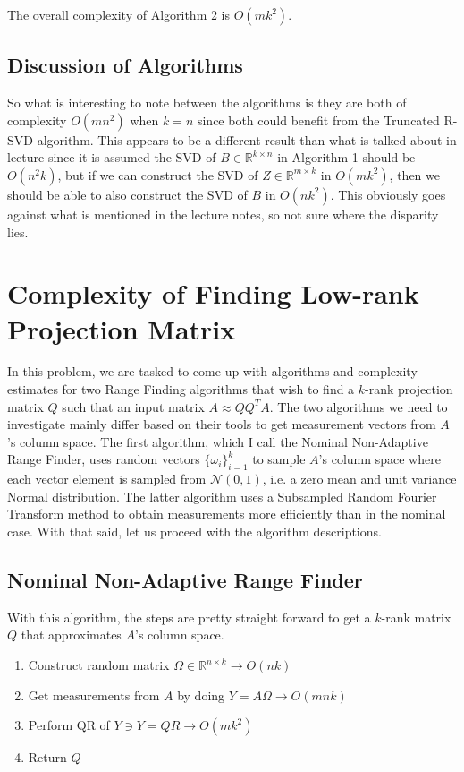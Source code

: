 \documentclass{article}[11pt]
\begin{document}
   The overall complexity of Algorithm 2 is $O(mk^2)$.
   
\subsection{Discussion of Algorithms}
So what is interesting to note between the algorithms is they are both of complexity $O(m n^2)$ when $k = n$ since both could benefit from the Truncated R-SVD algorithm. This appears to be a different result than what is talked about in lecture since it is assumed the SVD of $B \in \mathbb{R}^{k \times n}$ in Algorithm 1 should be $O(n^2k)$, but if we can construct the SVD of $Z \in \mathbb{R}^{m \times k}$  in $O(mk^2)$, then we should be able to also construct the SVD of $B$ in $O(nk^2)$. This obviously goes against what is mentioned in the lecture notes, so not sure where the disparity lies.
   
   \newpage
   \section{ Complexity of Finding Low-rank Projection Matrix }
   In this problem, we are tasked to come up with algorithms and complexity estimates for two Range Finding algorithms that wish to find a $k$-rank projection matrix $Q$ such that an input matrix $A \approx Q Q^T A$. The two algorithms we need to investigate mainly differ based on their tools to get measurement vectors from $A$'s column space. The first algorithm, which I call the Nominal Non-Adaptive Range Finder, uses random vectors $\lbrace \omega_i \rbrace_{i=1}^k$ to sample $A$'s column space where each vector element is sampled from $\mathcal{N}(0,1)$, i.e. a zero mean and unit variance Normal distribution. The latter algorithm uses a Subsampled Random Fourier Transform method to obtain measurements more efficiently than in the nominal case. With that said, let us proceed with the algorithm descriptions.
   
   \subsection{Nominal Non-Adaptive Range Finder}
   With this algorithm, the steps are pretty straight forward to get a $k$-rank matrix $Q$ that approximates $A$'s column space.
   
   \begin{enumerate}
   \item Construct random matrix $\Omega \in \mathbb{R}^{n \times k} \rightarrow O(nk)$
   \item Get measurements from $A$ by doing $Y = A\Omega \rightarrow O(mnk)$
   \item Perform QR of $Y \ni Y = QR \rightarrow O(mk^2)$
   \item Return $Q$
   \end{enumerate}
   
\end{document}
